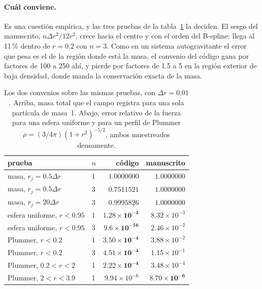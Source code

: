 \documentclass[11pt,a4paper]{article}
\begin{document}
\paragraph{Cuál conviene.} Es una cuestión empírica, y las tres pruebas de la
tabla~\ref{tab:convenios} la deciden. El sesgo del manuscrito, $n\Delta r^{2}/12r^{2}$,
crece hacia el centro y con el orden del B-spline: llega al 11\,\% dentro de $r=0.2$ con
$n=3$. Como en un sistema autogravitante el error que pesa es el de la región donde está
la masa, el convenio del código gana por factores de 100 a 250 ahí, y pierde por factores
de 1.5 a 5 en la región exterior de baja densidad, donde manda la conservación exacta de
la masa.

\begin{table}[htbp]
\centering
\caption{Los dos convenios sobre las mismas pruebas, con $\Delta r=0.01$. Arriba, masa
total que el campo registra para una sola partícula de masa~1. Abajo, error relativo de
la fuerza para una esfera uniforme y para un perfil de Plummer
$\rho=(3/4\pi)(1+r^2)^{-5/2}$, ambos muestreados densamente.}
\label{tab:convenios}
\begin{tabular}{llrr}
\toprule
prueba & $n$ & código & manuscrito \\
\midrule
masa, $r_j=0.5\Delta r$  & 1 & $1.0000000$ & $1.0000000$ \\
masa, $r_j=0.5\Delta r$  & 3 & $0.7511521$ & $\mathbf{1.0000000}$ \\
masa, $r_j=20\Delta r$   & 3 & $0.9995826$ & $\mathbf{1.0000000}$ \\
\midrule
esfera uniforme, $r<0.95$ & 1 & $\mathbf{1.28\times10^{-4}}$ & $8.32\times10^{-3}$ \\
esfera uniforme, $r<0.95$ & 3 & $\mathbf{9.6\times10^{-16}}$ & $2.46\times10^{-2}$ \\
\midrule
Plummer, $r<0.2$          & 1 & $\mathbf{3.50\times10^{-4}}$ & $3.88\times10^{-2}$ \\
Plummer, $r<0.2$          & 3 & $\mathbf{4.51\times10^{-4}}$ & $1.15\times10^{-1}$ \\
Plummer, $0.2<r<2$        & 1 & $\mathbf{2.22\times10^{-4}}$ & $3.48\times10^{-4}$ \\
Plummer, $2<r<3.9$        & 1 & $9.94\times10^{-6}$ & $\mathbf{8.70\times10^{-6}}$ \\
\bottomrule
\end{tabular}
\end{table}
\end{document}
